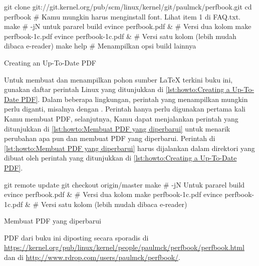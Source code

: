 \begin{listing}
\begin{VerbatimL}[breaklines=true,breakafter=/,
        breakaftersymbolpre=\raisebox{-.7ex}{\textcolor{darkgray}{\Pisymbol{psy}{191}}},
	breaksymbolleft=\textcolor{darkgray}{\tiny\ensuremath{\hookrightarrow}},
        numbers=none,xleftmargin=0pt]
git clone git://git.kernel.org/pub/scm/linux/kernel/git/paulmck/perfbook.git
cd perfbook
# Kamu mungkin harus menginstall font. Lihat item 1 di FAQ.txt.
make                     # -jN untuk pararel build
evince perfbook.pdf &    # Versi dua kolom
make perfbook-1c.pdf
evince perfbook-1c.pdf & # Versi satu kolom (lebih mudah dibaca e-reader)
make help                # Menampilkan opsi build lainnya
\end{VerbatimL}
\caption{Creating an Up-To-Date PDF}
\label{lst:howto:Creating a Up-To-Date PDF}
\end{listing}

Untuk membuat dan menampilkan pohon sumber \LaTeX{} terkini buku ini,
gunakan daftar perintah Linux yang ditunjukkan di
\cref{lst:howto:Creating a Up-To-Date PDF}.
Dalam beberapa lingkungan, perintah  yang menampilkan
 mungkin perlu diganti, misalnya dengan .
Perintah  hanya perlu digunakan pertama kali Kamu membuat PDF,
selanjutnya, Kamu dapat menjalankan perintah yang ditunjukkan di
\cref{lst:howto:Membuat PDF yang diperbarui} untuk menarik perubahan apa pun
dan membuat PDF yang diperbarui.\@
Perintah di \cref{lst:howto:Membuat PDF yang diperbarui} harus dijalankan
dalam direktori  yang dibuat oleh perintah yang ditunjukkan di
\cref{lst:howto:Creating a Up-To-Date PDF}.

\begin{listing}
\begin{VerbatimL}[numbers=none,xleftmargin=0pt]
git remote update
git checkout origin/master
make                     # -jN Untuk pararel build
evince perfbook.pdf &    # Versi dua kolom
make perfbook-1c.pdf
evince perfbook-1c.pdf & # Versi satu kolom (lebih mudah dibaca e-reader)
\end{VerbatimL}
\caption{Membuat PDF yang diperbarui}
\label{lst:howto:Membuat PDF yang diperbarui}
\end{listing}

PDF dari buku ini diposting secara sporadis di
\url{https://kernel.org/pub/linux/kernel/people/paulmck/perfbook/perfbook.html}
dan di
\url{http://www.rdrop.com/users/paulmck/perfbook/}.

